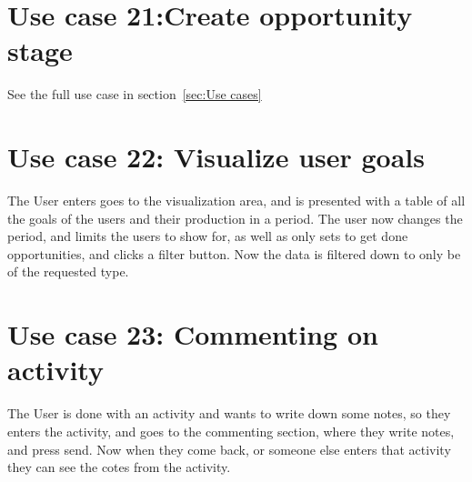 \section{Use case 21:Create opportunity stage }
See the full use case in section~\ref{sec:Use cases}

\section{Use case 22: Visualize user goals }
The User enters goes to the visualization area, and is presented with a table of all the goals of the users and their production in a period. The user now changes the period, and limits the users to show for, as well as only sets to get done opportunities, and clicks a filter button. Now the data is filtered down to only be of the requested type.

\section{Use case 23: Commenting on activity }
The User is done with an activity and wants to write down some notes, so they enters the activity, and goes to the commenting section, where they write notes, and press send. Now when they come back, or someone else enters that activity they can see the cotes from the activity.
